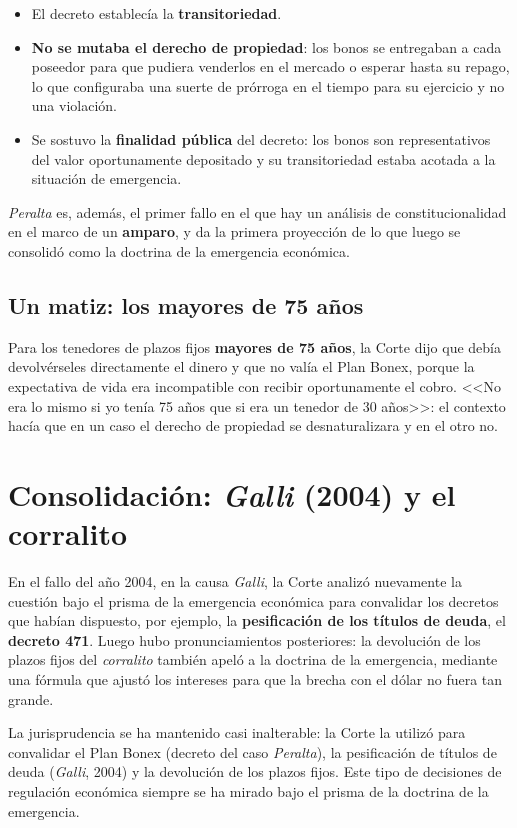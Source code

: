 \documentclass[12pt,oneside]{book}
\begin{document}
\begin{itemize}
    \item El decreto establecía la \textbf{transitoriedad}.
    \item \textbf{No se mutaba el derecho de propiedad}: los bonos se entregaban a cada poseedor para que pudiera venderlos en el mercado o esperar hasta su repago, lo que configuraba una suerte de prórroga en el tiempo para su ejercicio y no una violación.
    \item Se sostuvo la \textbf{finalidad pública} del decreto: los bonos son representativos del valor oportunamente depositado y su transitoriedad estaba acotada a la situación de emergencia.
\end{itemize}

\textit{Peralta} es, además, el primer fallo en el que hay un análisis de constitucionalidad en el marco de un \textbf{amparo}, y da la primera proyección de lo que luego se consolidó como la doctrina de la emergencia económica.

\subsection{Un matiz: los mayores de 75 años}

Para los tenedores de plazos fijos \textbf{mayores de 75 años}, la Corte dijo que debía devolvérseles directamente el dinero y que no valía el Plan Bonex, porque la expectativa de vida era incompatible con recibir oportunamente el cobro. <<No era lo mismo si yo tenía 75 años que si era un tenedor de 30 años>>: el contexto hacía que en un caso el derecho de propiedad se desnaturalizara y en el otro no.

\section{Consolidación: \textit{Galli} (2004) y el corralito}

En el fallo del año 2004, en la causa \textit{Galli}, la Corte analizó nuevamente la cuestión bajo el prisma de la emergencia económica para convalidar los decretos que habían dispuesto, por ejemplo, la \textbf{pesificación de los títulos de deuda}, el \textbf{decreto 471}. Luego hubo pronunciamientos posteriores: la devolución de los plazos fijos del \textit{corralito} también apeló a la doctrina de la emergencia, mediante una fórmula que ajustó los intereses para que la brecha con el dólar no fuera tan grande.

La jurisprudencia se ha mantenido casi inalterable: la Corte la utilizó para convalidar el Plan Bonex (decreto del caso \textit{Peralta}), la pesificación de títulos de deuda (\textit{Galli}, 2004) y la devolución de los plazos fijos. Este tipo de decisiones de regulación económica siempre se ha mirado bajo el prisma de la doctrina de la emergencia.
\end{document}
